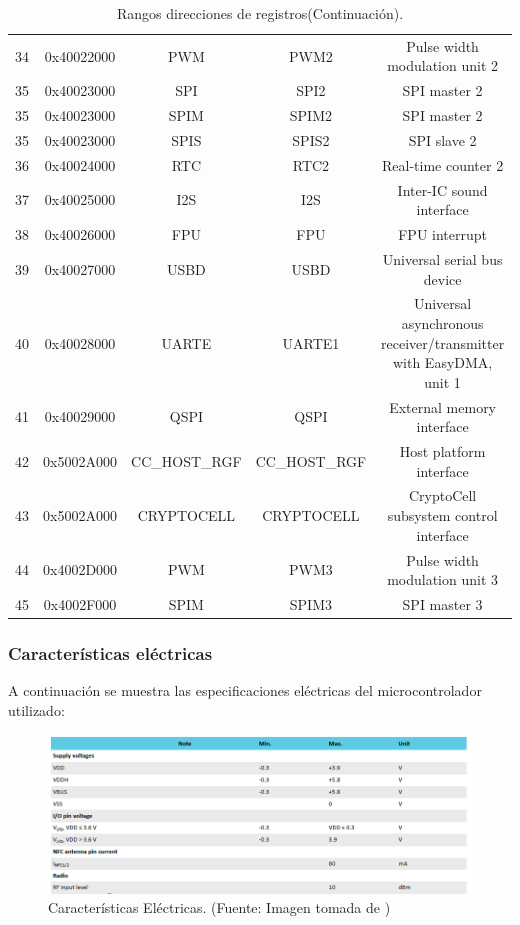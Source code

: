 \begin{table}[H]
\begin{tabular}{|c|c|c|c|c|}
        34 & 0x40022000 & PWM & PWM2 & Pulse width modulation unit 2 \\
        35 & 0x40023000 & SPI & SPI2 & SPI master 2 \\
        35 & 0x40023000 & SPIM & SPIM2 & SPI master 2 \\
        35 & 0x40023000 & SPIS & SPIS2 & SPI slave 2 \\
        36 & 0x40024000 & RTC & RTC2 & Real-time counter 2 \\
        37 & 0x40025000 & I2S & I2S & Inter-IC sound interface \\
        38 & 0x40026000 & FPU & FPU & FPU interrupt \\
        39 & 0x40027000 & USBD & USBD & Universal serial bus device \\
        40 & 0x40028000 & UARTE & UARTE1 & Universal asynchronous receiver/transmitter with EasyDMA, unit 1 \\
        41 & 0x40029000 & QSPI & QSPI & External memory interface \\
        42 & 0x5002A000 & CC\_HOST\_RGF & CC\_HOST\_RGF & Host platform interface \\
        43 & 0x5002A000 & CRYPTOCELL & CRYPTOCELL & CryptoCell subsystem control interface \\
        44 & 0x4002D000 & PWM & PWM3 & Pulse width modulation unit 3 \\
        45 & 0x4002F000 & SPIM & SPIM3 & SPI master 3 \\
        \hline
    \end{tabular}
    \caption{Rangos direcciones de registros(Continuación).\cite{ST}}
    \label{tab:nrf52840_peripherals_cont}
\end{table}
\newpage

\subsubsection{Características eléctricas}
A continuación se muestra las especificaciones eléctricas del microcontrolador utilizado:

\begin{figure}[H]
\centering
\includegraphics[scale=0.8]{./Figuras/Nota_teorica/ELECTRIC_NRF}
\caption{Características Eléctricas. (Fuente: Imagen tomada de \cite{ST})}
\label{fig:ELEC1}
\end{figure}

